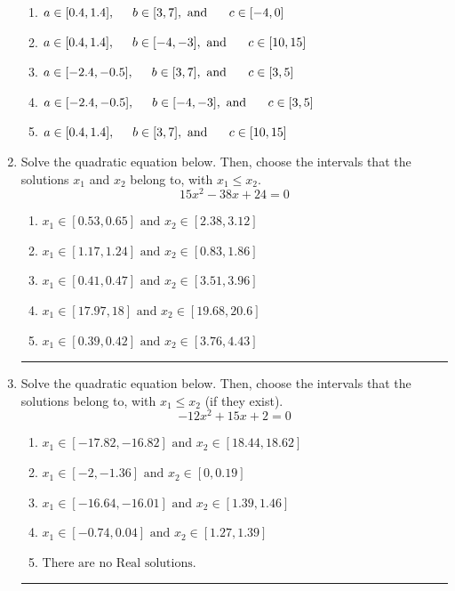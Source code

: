 \documentclass[14pt]{extbook}
\newcommand{\litem}[1]{\item#1\hspace*{-1cm}\rule{\textwidth}{0.4pt}}
\begin{document}
\begin{enumerate}
{\begin{center}
\end{center}
\begin{enumerate}[label=\Alph*.]
\item \( a \in [0.4, 1.4], \hspace*{5mm} b \in [3, 7], \text{ and } \hspace*{5mm} c \in [-4, 0] \)
\item \( a \in [0.4, 1.4], \hspace*{5mm} b \in [-4, -3], \text{ and } \hspace*{5mm} c \in [10, 15] \)
\item \( a \in [-2.4, -0.5], \hspace*{5mm} b \in [3, 7], \text{ and } \hspace*{5mm} c \in [3, 5] \)
\item \( a \in [-2.4, -0.5], \hspace*{5mm} b \in [-4, -3], \text{ and } \hspace*{5mm} c \in [3, 5] \)
\item \( a \in [0.4, 1.4], \hspace*{5mm} b \in [3, 7], \text{ and } \hspace*{5mm} c \in [10, 15] \)

\end{enumerate} }
\litem{
Solve the quadratic equation below. Then, choose the intervals that the solutions $x_1$ and $x_2$ belong to, with $x_1 \leq x_2$.\[ 15x^{2} -38 x + 24 = 0 \]\begin{enumerate}[label=\Alph*.]
\item \( x_1 \in [0.53, 0.65] \text{ and } x_2 \in [2.38, 3.12] \)
\item \( x_1 \in [1.17, 1.24] \text{ and } x_2 \in [0.83, 1.86] \)
\item \( x_1 \in [0.41, 0.47] \text{ and } x_2 \in [3.51, 3.96] \)
\item \( x_1 \in [17.97, 18] \text{ and } x_2 \in [19.68, 20.6] \)
\item \( x_1 \in [0.39, 0.42] \text{ and } x_2 \in [3.76, 4.43] \)

\end{enumerate} }
\litem{
Solve the quadratic equation below. Then, choose the intervals that the solutions belong to, with $x_1 \leq x_2$ (if they exist).\[ -12x^{2} +15 x + 2 = 0 \]\begin{enumerate}[label=\Alph*.]
\item \( x_1 \in [-17.82, -16.82] \text{ and } x_2 \in [18.44, 18.62] \)
\item \( x_1 \in [-2, -1.36] \text{ and } x_2 \in [0, 0.19] \)
\item \( x_1 \in [-16.64, -16.01] \text{ and } x_2 \in [1.39, 1.46] \)
\item \( x_1 \in [-0.74, 0.04] \text{ and } x_2 \in [1.27, 1.39] \)
\item \( \text{There are no Real solutions.} \)


\end{enumerate}}
\end{enumerate}
\end{document}
